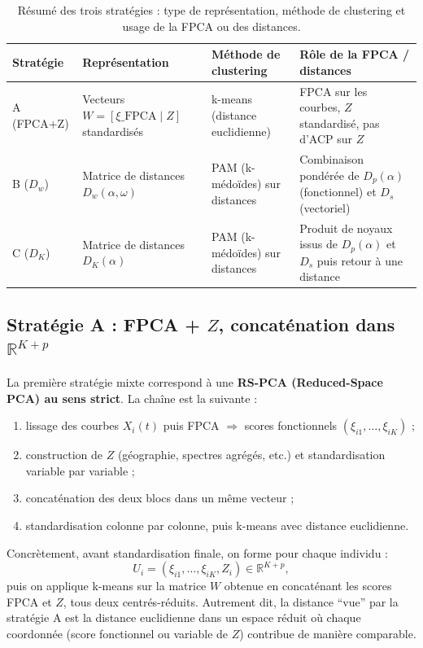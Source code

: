 \documentclass[11pt, a4paper]{article}
\newcommand{\R}{\mathbb{R}}
\newcommand{\Dp}{D_p}
\newcommand{\Dw}{D_w}
\newcommand{\DK}{D_K}
\begin{document}
\begin{table}[H]
\centering
\renewcommand{\arraystretch}{1.25}
\begin{tabular}{l p{3.2cm} p{3.4cm} p{3.4cm}}
  \toprule
  \textbf{Stratégie} & \textbf{Représentation} &
  \textbf{Méthode de clustering} & \textbf{Rôle de la FPCA / distances} \\
  \midrule
  A (FPCA+Z) &
  Vecteurs $W = [\xi\_{\text{FPCA}} \mid Z]$ standardisés &
  k-means (distance euclidienne) &
  FPCA sur les courbes, $Z$ standardisé, pas d'ACP sur $Z$ \\
  B ($\Dw$) &
  Matrice de distances $\Dw(\alpha,\omega)$ &
  PAM (k-médoïdes) sur distances &
  Combinaison pondérée de $\Dp(\alpha)$ (fonctionnel) et $D_s$ (vectoriel) \\
  C ($\DK$) &
  Matrice de distances $\DK(\alpha)$ &
  PAM (k-médoïdes) sur distances &
  Produit de noyaux issus de $\Dp(\alpha)$ et $D_s$ puis retour à une distance \\
  \bottomrule
\end{tabular}
\caption{Résumé des trois stratégies : type de représentation, méthode de
clustering et usage de la FPCA ou des distances.}
\end{table}

\subsection{Stratégie A : FPCA + $Z$, concaténation dans $\R^{K+p}$}

La première stratégie mixte correspond à une \textbf{RS-PCA (Reduced-Space
PCA) au sens strict}. La chaîne est la suivante :
\begin{enumerate}[nosep]
  \item lissage des courbes $X_i(t)$ puis FPCA $\Rightarrow$ scores
        fonctionnels $(\xi_{i1}, \ldots, \xi_{iK})$ ;
  \item construction de $Z$ (géographie, spectres agrégés, etc.) et
        standardisation variable par variable ;
  \item concaténation des deux blocs dans un même vecteur ;
  \item standardisation colonne par colonne, puis k-means avec distance
        euclidienne.
\end{enumerate}

Concrètement, avant standardisation finale, on forme pour chaque
individu :
\[
  U_i = (\xi_{i1}, \ldots, \xi_{iK}, Z_i) \in \R^{K+p},
\]
puis on applique k-means sur la matrice $W$ obtenue en concaténant les
scores FPCA et $Z$, tous deux centrés-réduits. Autrement dit, la
distance ``vue'' par la stratégie A est la distance euclidienne dans un
espace réduit où chaque coordonnée (score fonctionnel ou variable de
$Z$) contribue de manière comparable.
\end{document}

